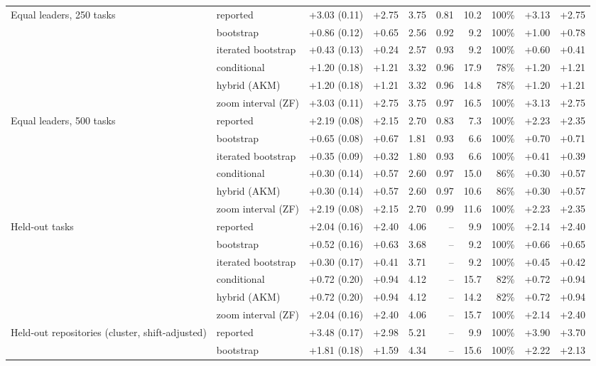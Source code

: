 \begin{tabular}{llrrrrrrrr}
\addlinespace
Equal leaders, 250 tasks & reported & +3.03 (0.11) & +2.75 & 3.75 & 0.81 & 10.2 & 100\% & +3.13 & +2.75 \\
 & bootstrap & +0.86 (0.12) & +0.65 & 2.56 & 0.92 & 9.2 & 100\% & +1.00 & +0.78 \\
 & iterated bootstrap & +0.43 (0.13) & +0.24 & 2.57 & 0.93 & 9.2 & 100\% & +0.60 & +0.41 \\
 & conditional & +1.20 (0.18) & +1.21 & 3.32 & 0.96 & 17.9 & 78\% & +1.20 & +1.21 \\
 & hybrid (AKM) & +1.20 (0.18) & +1.21 & 3.32 & 0.96 & 14.8 & 78\% & +1.20 & +1.21 \\
 & zoom interval (ZF) & +3.03 (0.11) & +2.75 & 3.75 & 0.97 & 16.5 & 100\% & +3.13 & +2.75 \\
\addlinespace
Equal leaders, 500 tasks & reported & +2.19 (0.08) & +2.15 & 2.70 & 0.83 & 7.3 & 100\% & +2.23 & +2.35 \\
 & bootstrap & +0.65 (0.08) & +0.67 & 1.81 & 0.93 & 6.6 & 100\% & +0.70 & +0.71 \\
 & iterated bootstrap & +0.35 (0.09) & +0.32 & 1.80 & 0.93 & 6.6 & 100\% & +0.41 & +0.39 \\
 & conditional & +0.30 (0.14) & +0.57 & 2.60 & 0.97 & 15.0 & 86\% & +0.30 & +0.57 \\
 & hybrid (AKM) & +0.30 (0.14) & +0.57 & 2.60 & 0.97 & 10.6 & 86\% & +0.30 & +0.57 \\
 & zoom interval (ZF) & +2.19 (0.08) & +2.15 & 2.70 & 0.99 & 11.6 & 100\% & +2.23 & +2.35 \\
\addlinespace
Held-out tasks & reported & +2.04 (0.16) & +2.40 & 4.06 & -- & 9.9 & 100\% & +2.14 & +2.40 \\
 & bootstrap & +0.52 (0.16) & +0.63 & 3.68 & -- & 9.2 & 100\% & +0.66 & +0.65 \\
 & iterated bootstrap & +0.30 (0.17) & +0.41 & 3.71 & -- & 9.2 & 100\% & +0.45 & +0.42 \\
 & conditional & +0.72 (0.20) & +0.94 & 4.12 & -- & 15.7 & 82\% & +0.72 & +0.94 \\
 & hybrid (AKM) & +0.72 (0.20) & +0.94 & 4.12 & -- & 14.2 & 82\% & +0.72 & +0.94 \\
 & zoom interval (ZF) & +2.04 (0.16) & +2.40 & 4.06 & -- & 15.7 & 100\% & +2.14 & +2.40 \\
\addlinespace
Held-out repositories (cluster, shift-adjusted) & reported & +3.48 (0.17) & +2.98 & 5.21 & -- & 9.9 & 100\% & +3.90 & +3.70 \\
 & bootstrap & +1.81 (0.18) & +1.59 & 4.34 & -- & 15.6 & 100\% & +2.22 & +2.13 \\

\end{tabular}
